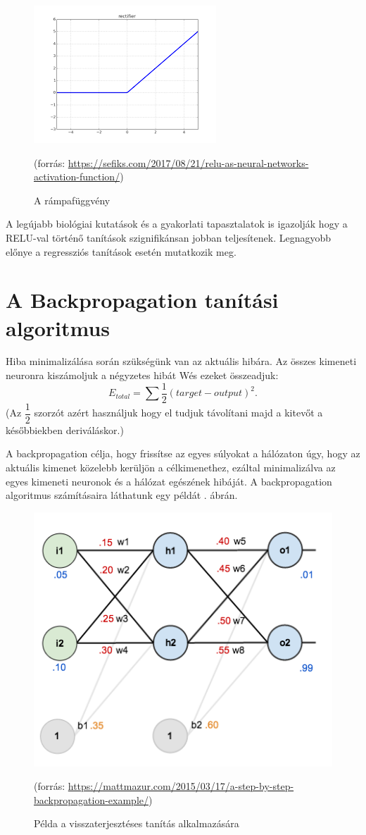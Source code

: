 \begin{figure}[h]
\centering
\includegraphics[scale=1.0]{images/relu}
\caption{A rámpafüggvény}
\label{fig:relu}
(forrás: \url{https://sefiks.com/2017/08/21/relu-as-neural-networks-activation-function/})
\end{figure}

A legújabb biológiai kutatások és a gyakorlati tapasztalatok is igazolják hogy a RELU-val történő tanítások szignifikánsan jobban teljesítenek. Legnagyobb előnye a regressziós tanítások esetén mutatkozik meg.

\section{A Backpropagation tanítási algoritmus}

Hiba minimalizálása során szükségünk van az aktuális hibára. Az összes kimeneti neuronra kiszámoljuk a négyzetes hibát Wés ezeket összeadjuk:
$$
E_{total} = \sum \dfrac{1}{2}(target - output)^2.
$$
(Az $\dfrac{1}{2}$ szorzót azért használjuk hogy el tudjuk távolítani majd a kitevőt a későbbiekben deriváláskor.)

A backpropagation célja, hogy frissítse az egyes súlyokat a hálózaton úgy, hogy az aktuális kimenet közelebb kerüljön a célkimenethez, ezáltal minimalizálva az egyes kimeneti neuronok és a hálózat egészének hibáját. A backpropagation algoritmus számításaira láthatunk egy példát . ábrán.

\begin{figure}[h]
\centering
\includegraphics[scale=0.5]{images/ANN_backprog}
\caption{Példa a visszaterjesztéses tanítás alkalmazására}
(forrás: \url{https://mattmazur.com/2015/03/17/a-step-by-step-backpropagation-example/})
\label{fig:ANN_backprog}
\end{figure}

